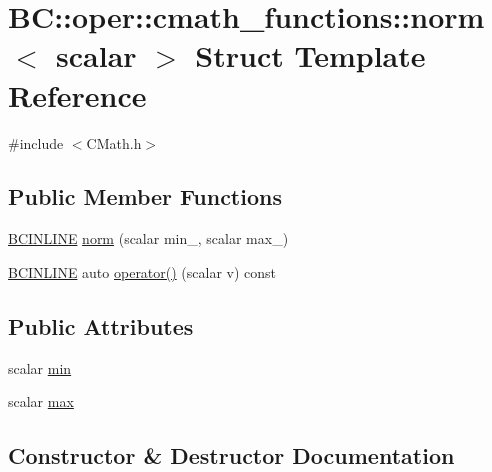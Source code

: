 \hypertarget{structBC_1_1oper_1_1cmath__functions_1_1norm}{}\section{BC\+:\+:oper\+:\+:cmath\+\_\+functions\+:\+:norm$<$ scalar $>$ Struct Template Reference}
\label{structBC_1_1oper_1_1cmath__functions_1_1norm}


{\ttfamily \#include $<$C\+Math.\+h$>$}

\subsection*{Public Member Functions}
\begin{DoxyCompactItemize}
\item 
\hyperlink{BlackCat__Common_8h_a6699e8b0449da5c0fafb878e59c1d4b1}{B\+C\+I\+N\+L\+I\+NE} \hyperlink{structBC_1_1oper_1_1cmath__functions_1_1norm_aaf9924c57653f8feec21affece941dbd}{norm} (scalar min\+\_\+, scalar max\+\_\+)
\item 
\hyperlink{BlackCat__Common_8h_a6699e8b0449da5c0fafb878e59c1d4b1}{B\+C\+I\+N\+L\+I\+NE} auto \hyperlink{structBC_1_1oper_1_1cmath__functions_1_1norm_a8d8223c16e0e9bae61d648c534e922c0}{operator()} (scalar v) const 
\end{DoxyCompactItemize}
\subsection*{Public Attributes}
\begin{DoxyCompactItemize}
\item 
scalar \hyperlink{structBC_1_1oper_1_1cmath__functions_1_1norm_a37b76407ad8bcdf19d4b3d778a2c9b3c}{min}
\item 
scalar \hyperlink{structBC_1_1oper_1_1cmath__functions_1_1norm_a7d5ce6bbb0c901d2316eb331bafa9605}{max}
\end{DoxyCompactItemize}


\subsection{Constructor \& Destructor Documentation}
